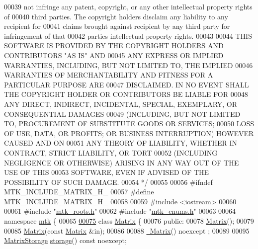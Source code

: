 \begin{DoxyCode}
00039 \textcolor{comment}{not infringe any patent, copyright, or any other intellectual property rights of}
00040 \textcolor{comment}{third parties. The copyright holders disclaim any liability to any recipient for}
00041 \textcolor{comment}{claims brought against recipient by any third party for infringement of that}
00042 \textcolor{comment}{parties intellectual property rights.}
00043 \textcolor{comment}{}
00044 \textcolor{comment}{THIS SOFTWARE IS PROVIDED BY THE COPYRIGHT HOLDERS AND CONTRIBUTORS "AS IS" AND}
00045 \textcolor{comment}{ANY EXPRESS OR IMPLIED WARRANTIES, INCLUDING, BUT NOT LIMITED TO, THE IMPLIED}
00046 \textcolor{comment}{WARRANTIES OF MERCHANTABILITY AND FITNESS FOR A PARTICULAR PURPOSE ARE}
00047 \textcolor{comment}{DISCLAIMED. IN NO EVENT SHALL THE COPYRIGHT HOLDER OR CONTRIBUTORS BE LIABLE FOR}
00048 \textcolor{comment}{ANY DIRECT, INDIRECT, INCIDENTAL, SPECIAL, EXEMPLARY, OR CONSEQUENTIAL DAMAGES}
00049 \textcolor{comment}{(INCLUDING, BUT NOT LIMITED TO, PROCUREMENT OF SUBSTITUTE GOODS OR SERVICES;}
00050 \textcolor{comment}{LOSS OF USE, DATA, OR PROFITS; OR BUSINESS INTERRUPTION) HOWEVER CAUSED AND ON}
00051 \textcolor{comment}{ANY THEORY OF LIABILITY, WHETHER IN CONTRACT, STRICT LIABILITY, OR TORT}
00052 \textcolor{comment}{(INCLUDING NEGLIGENCE OR OTHERWISE) ARISING IN ANY WAY OUT OF THE USE OF THIS}
00053 \textcolor{comment}{SOFTWARE, EVEN IF ADVISED OF THE POSSIBILITY OF SUCH DAMAGE.}
00054 \textcolor{comment}{*/}
00055 
00056 \textcolor{preprocessor}{#ifndef MTK\_INCLUDE\_MATRIX\_H\_}
00057 \textcolor{preprocessor}{#define MTK\_INCLUDE\_MATRIX\_H\_}
00058 
00059 \textcolor{preprocessor}{#include <iostream>}
00060 
00061 \textcolor{preprocessor}{#include "\hyperlink{mtk__roots_8h}{mtk\_roots.h}"}
00062 \textcolor{preprocessor}{#include "\hyperlink{mtk__enums_8h}{mtk\_enums.h}"}
00063 
00064 \textcolor{keyword}{namespace }\hyperlink{namespacemtk}{mtk} \{
00065 
\hypertarget{mtk__matrix_8h_source_l00075}{}\hyperlink{classmtk_1_1Matrix}{00075} \textcolor{keyword}{class }\hyperlink{classmtk_1_1Matrix}{Matrix} \{
00076  \textcolor{keyword}{public}:
00078   \hyperlink{classmtk_1_1Matrix_a04b8575764d3a649f21950c794f4cc02}{Matrix}();
00079 
00085   \hyperlink{classmtk_1_1Matrix_a04b8575764d3a649f21950c794f4cc02}{Matrix}(\textcolor{keyword}{const} \hyperlink{classmtk_1_1Matrix}{Matrix} &in);
00086 
00088   \hyperlink{classmtk_1_1Matrix_a4e8dd5a0654121513421aaf584ef604e}{~Matrix}() noexcept ;
00089 
00095   \hyperlink{group__c02-enums_ga25b67ec6a2afeee69f9bb196a9c66619}{MatrixStorage} \hyperlink{classmtk_1_1Matrix_a9ffaa665a9cf7371b3be568415a08a3b}{storage}() \textcolor{keyword}{const} noexcept;

\end{DoxyCode}
